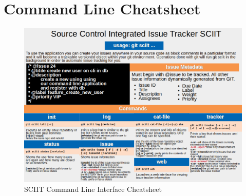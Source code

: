 \documentclass{mproj}
\begin{document}
\chapter{Command Line Cheatsheet}
\begin{figure}[h!]
\caption{SCIIT Command Line Interface Cheatsheet}
\label{fig:sciit-cheatsheet}
\centering
\includegraphics[width=16cm]{Cheatsheet}
\end{figure}




\end{document}
